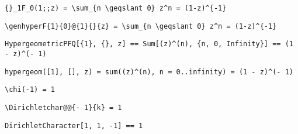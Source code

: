 \newsavebox\AUT
\begin{lrbox}{\AUT}
 \begin{minipage}[t]{0.82\textwidth}
  \lstinline[language={[latex]TeX},mathescape,breaklines=true]"{}_1F_0(1;;z) = \sum_{n \geqslant 0} z^n = (1-z)^{-1}"
 \end{minipage}
\end{lrbox}
\newsavebox\AUST
\begin{lrbox}{\AUST}
 \begin{minipage}[t]{0.82\textwidth}
  \lstinline[language={[latex]TeX},mathescape,breaklines=true]"\genhyperF{1}{0}@{1}{}{z} = \sum_{n \geqslant 0} z^n = (1-z)^{-1}"
 \end{minipage}
\end{lrbox}
\newsavebox\AUMM
\begin{lrbox}{\AUMM}
 \begin{minipage}[t]{0.82\textwidth}
  \lstinline[language={[latex]TeX},mathescape,breaklines=true]"HypergeometricPFQ[{1}, {}, z] == Sum[(z)^(n), {n, 0, Infinity}] == (1 - z)^(- 1)"
 \end{minipage}
\end{lrbox}
\newsavebox\AUMA
\begin{lrbox}{\AUMA}
 \begin{minipage}[t]{0.82\textwidth}
  \lstinline[language={[latex]TeX},mathescape,breaklines=true]"hypergeom([1], [], z) = sum((z)^(n), n = 0..infinity) = (1 - z)^(- 1)"
 \end{minipage}
\end{lrbox}
\newsavebox\AVT
\begin{lrbox}{\AVT}
 \begin{minipage}[t]{0.82\textwidth}
  \lstinline[language={[latex]TeX},mathescape,breaklines=true]"\chi(-1) = 1"
 \end{minipage}
\end{lrbox}
\newsavebox\AVST
\begin{lrbox}{\AVST}
 \begin{minipage}[t]{0.82\textwidth}
  \lstinline[language={[latex]TeX},mathescape,breaklines=true]"\Dirichletchar@@{- 1}{k} = 1"
 \end{minipage}
\end{lrbox}
\newsavebox\AVMM
\begin{lrbox}{\AVMM}
 \begin{minipage}[t]{0.82\textwidth}
  \lstinline[language={[latex]TeX},mathescape,breaklines=true]"DirichletCharacter[1, 1, -1] == 1"
 \end{minipage}
\end{lrbox}
